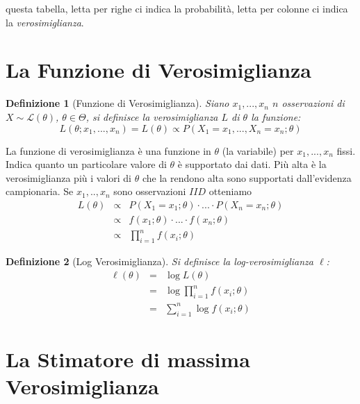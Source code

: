 \documentclass[
  11pt,
]{book}
\theoremstyle{mytheoremstyle}
\theoremstyle{mydefstyle}
\newtheorem{definition}{Definizione}[section]
\begin{document}
questa tabella, letta per righe ci indica la probabilità, letta per colonne ci indica la \emph{verosimiglianza}.

\section{La Funzione di Verosimiglianza}\label{la-funzione-di-verosimiglianza}

\begin{info}

\begin{definition}[Funzione di Verosimiglianza]
Siano \(x_1,...,x_n\) \(n\) osservazioni di \(X\sim \mathscr{L}(\theta)\), \(\theta\in\Theta\), si definisce la verosimiglianza \(L\) di \(\theta\) la funzione:
\[L(\theta;x_1,...,x_n)=L(\theta)\propto P(X_1=x_1,...,X_n=x_n;\theta)\]
\end{definition}

\end{info}

La funzione di verosimiglianza è una funzione in \(\theta\) (la variabile) per
\(x_1,...,x_n\) fissi. Indica quanto un particolare valore di \(\theta\) è supportato dai dati.
Più alta è la verosimiglianza più i valori di \(\theta\) che la rendono alta sono supportati dall'evidenza campionaria.
Se \(x_1,..,x_n\) sono osservazioni \(IID\) otteniamo
\begin{eqnarray*}
L(\theta) &\propto& P(X_1=x_1;\theta)\cdot...\cdot P(X_n=x_n;\theta) \\
          &\propto& f(x_1;\theta)\cdot...\cdot f(x_n;\theta)\\
          &\propto& \prod_{i=1}^n f(x_i;\theta)
\end{eqnarray*}

\begin{info}

\begin{definition}[Log Verosimiglianza]
Si definisce la log-verosimiglianza \(\ell\):
\begin{eqnarray*}
\ell(\theta) &=& \log L(\theta) \\
             &=& \log \prod_{i=1}^n f(x_i;\theta)\\
             &=& \sum_{i=1}^n \log f(x_i;\theta)
\end{eqnarray*}
\end{definition}

\end{info}

\section{La Stimatore di massima Verosimiglianza}\label{la-stimatore-di-massima-verosimiglianza}
\end{document}

